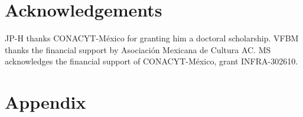 \documentclass[%
 preprint,
 amsmath,amssymb,
 aps,
]{revtex4-2}
\begin{document}
	
\section*{Acknowledgements}

JP-H thanks CONACYT-México for granting him a doctoral scholarship. VFBM thanks the financial support by Asociación Mexicana de Cultura AC. MS acknowledges the financial support of CONACYT-México, grant INFRA-302610. 
	
	
	\appendix
	
	\section*{Appendix}
\end{document}
